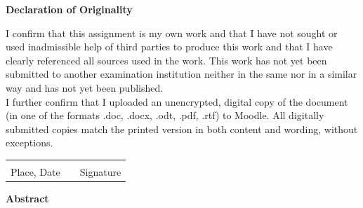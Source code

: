 \documentclass[a4paper,oneside,12pt]{report}
\begin{document}
\vspace*{5cm} 
\begin{center}
    \textbf{Declaration of Originality}
\end{center}

I confirm that this assignment is my own work and that I have not sought or used inadmissible help of third parties to produce this work and that I have clearly referenced all sources used in the work. This work has not yet been submitted to another examination institution neither in the same nor in a similar way and has not yet been published.\\[5mm]
I further confirm that I uploaded an unencrypted, digital copy of the document (in one of the formats .doc, .docx, .odt, .pdf, .rtf) to Moodle. All digitally submitted copies match the printed version in both content and wording, without exceptions.\\[2cm]

\begin{tabular}{ p{5cm}p{1cm}p{5cm} }
    \hrulefill & & \hrulefill\\
    Place, Date & & Signature
\end{tabular}

\newpage

\vspace*{3cm} 
\begin{center}
    \textbf{Abstract}
\end{center}

\varabstract

\newpage

\tableofcontents

\newpage
{}



\clearpage
	
\end{document}
